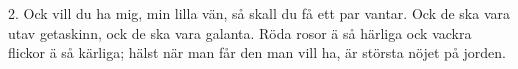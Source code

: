2.  Ock vill du ha mig, min lilla vän,
    så skall du få ett par vantar.
    Ock de ska vara utav getaskinn,
    ock de ska vara galanta.
    Röda rosor ä så härliga
    ock vackra flickor ä så kärliga;
    hälst när man får den man vill ha,
    är största nöjet på jorden.
